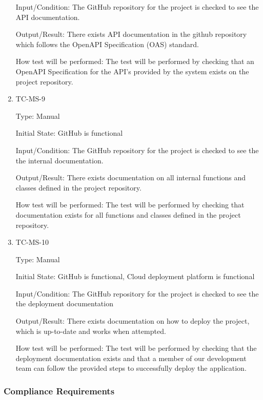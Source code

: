 \documentclass[12pt, titlepage]{article}
\begin{document}
\begin{enumerate}
    Input/Condition: The GitHub repository for the project is checked
    to see the API documentation.

    Output/Result: There exists API documentation in the github
    repository which follows the OpenAPI Specification (OAS) standard.

    How test will be performed: The test will be performed by
    checking that an OpenAPI Specification for the API's provided by
    the system exists on the project repository.

  \item{TC-MS-9\\}

    Type: Manual

    Initial State: GitHub is functional

    Input/Condition: The GitHub repository for the project is checked
    to see the the internal documentation.

    Output/Result: There exists documentation on all internal
    functions and classes defined in the project repository.

    How test will be performed: The test will be performed by
    checking that documentation exists for all functions and classes
    defined in the project repository.

  \item{TC-MS-10\\}

    Type: Manual

    Initial State: GitHub is functional, Cloud deployment platform is functional

    Input/Condition: The GitHub repository for the project is checked
    to see the the deployment documentation

    Output/Result: There exists documentation on how to deploy the
    project, which is up-to-date and works when attempted.

    How test will be performed: The test will be performed by
    checking that the deployment documentation exists and that a
    member of our development team can follow the provided steps to
    successfully deploy the application.

\end{enumerate}

\subsubsection{Compliance Requirements}
\end{document}
